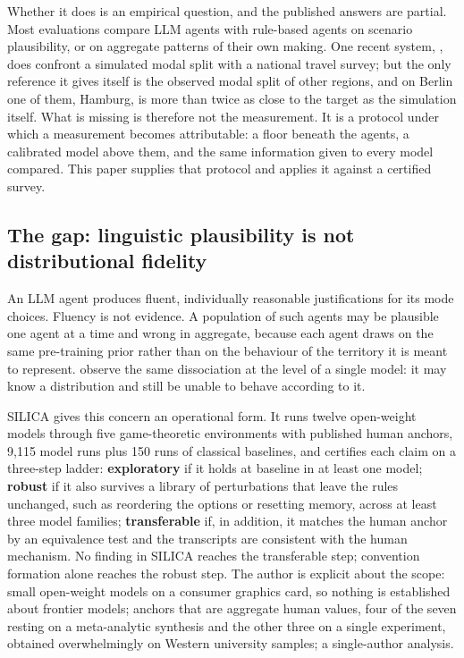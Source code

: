 Whether it does is an empirical question, and the published answers are partial. Most evaluations compare LLM agents with rule-based agents on scenario plausibility, or on aggregate patterns of their own making. One recent system, \citep{lammer2026gta}, does confront a simulated modal split with a national travel survey; but the only reference it gives itself is the observed modal split of other regions, and on Berlin one of them, Hamburg, is more than twice as close to the target as the simulation itself. What is missing is therefore not the measurement. It is a protocol under which a measurement becomes attributable: a floor beneath the agents, a calibrated model above them, and the same information given to every model compared. This paper supplies that protocol and applies it against a certified survey.

\subsection{The gap: linguistic plausibility is not distributional fidelity}
\label{sec:gap}

An LLM agent produces fluent, individually reasonable justifications for its mode choices. Fluency is not evidence. A population of such agents may be plausible one agent at a time and wrong in aggregate, because each agent draws on the same pre-training prior rather than on the behaviour of the territory it is meant to represent. \citet{meister2024benchmarking} observe the same dissociation at the level of a single model: it may know a distribution and still be unable to behave according to it.

SILICA \citep{bintareaf2026silica} gives this concern an operational form. It runs twelve open-weight models through five game-theoretic environments with published human anchors, 9,115 model runs plus 150 runs of classical baselines, and certifies each claim on a three-step ladder: \textbf{exploratory} if it holds at baseline in at least one model; \textbf{robust} if it also survives a library of perturbations that leave the rules unchanged, such as reordering the options or resetting memory, across at least three model families; \textbf{transferable} if, in addition, it matches the human anchor by an equivalence test and the transcripts are consistent with the human mechanism. No finding in SILICA reaches the transferable step; convention formation alone reaches the robust step. The author is explicit about the scope: small open-weight models on a consumer graphics card, so nothing is established about frontier models; anchors that are aggregate human values, four of the seven resting on a meta-analytic synthesis and the other three on a single experiment, obtained overwhelmingly on Western university samples; a single-author analysis.

